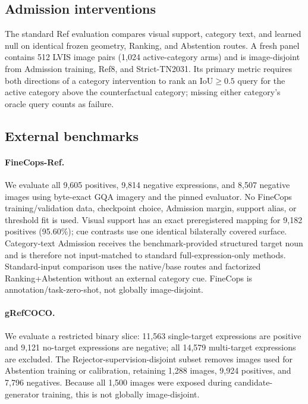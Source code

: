 \subsection{Admission interventions}
The standard Ref evaluation compares visual support, category text, and
learned null on identical frozen geometry, Ranking, and Abstention routes.  A
fresh panel contains 512 LVIS image pairs (1,024 active-category arms) and is
image-disjoint from Admission training, Ref8, and Strict-TN2031.  Its primary
metric requires both directions of a category intervention to rank an
IoU$\geq0.5$ query for the active category above the counterfactual category;
missing either category's oracle query counts as failure.

\subsection{External benchmarks}
\paragraph{FineCops-Ref.}
We evaluate all 9,605 positives, 9,814 negative expressions, and 8,507 negative
images using byte-exact GQA imagery and the pinned evaluator.  No FineCops
training/validation data, checkpoint choice, Admission margin, support alias,
or threshold fit is used.  Visual support has an exact preregistered mapping
for 9,182 positives (95.60\%); cue contrasts use one identical bilaterally
covered surface.  Category-text Admission receives the benchmark-provided
structured target noun and is therefore not input-matched to standard
full-expression-only methods.  Standard-input comparison uses the native/base
routes and factorized Ranking+Abstention without an external category cue.
FineCops is annotation/task-zero-shot, not globally image-disjoint.

\paragraph{gRefCOCO.}
We evaluate a restricted binary slice: 11,563 single-target expressions are
positive and 9,121 no-target expressions are negative; all 14,579 multi-target
expressions are excluded.  The Rejector-supervision-disjoint subset removes
images used for Abstention training or calibration, retaining 1,288 images,
9,924 positives, and 7,796 negatives.  Because all 1,500 images were exposed
during candidate-generator training, this is not globally image-disjoint.

